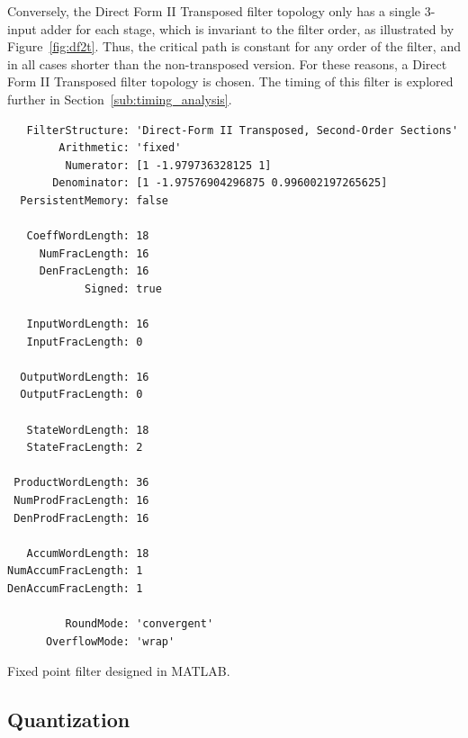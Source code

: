 \documentclass[]{article}
\begin{document}
Conversely, the Direct Form II Transposed filter topology only has a single 3-input adder for each stage, which is invariant to the filter order, as illustrated by Figure~\ref{fig:df2t}.
Thus, the critical path is constant for any order of the filter, and in all cases shorter than the non-transposed version. For these reasons, a Direct Form II Transposed filter topology is chosen. The timing of this filter is explored further in Section~\ref{sub:timing_analysis}.


\begin{table}[tbp]
	\begin{center}
		\begin{lstlisting}
   FilterStructure: 'Direct-Form II Transposed, Second-Order Sections'
        Arithmetic: 'fixed'
         Numerator: [1 -1.979736328125 1]                  
       Denominator: [1 -1.97576904296875 0.996002197265625]
  PersistentMemory: false

   CoeffWordLength: 18                
     NumFracLength: 16                
     DenFracLength: 16
            Signed: true              
                                      
   InputWordLength: 16                
   InputFracLength: 0                 
                                      
  OutputWordLength: 16
  OutputFracLength: 0                 
                                      
   StateWordLength: 18
   StateFracLength: 2                 
                                      
 ProductWordLength: 36                
 NumProdFracLength: 16                
 DenProdFracLength: 16                
                                      
   AccumWordLength: 18                
NumAccumFracLength: 1                 
DenAccumFracLength: 1                 

         RoundMode: 'convergent'      
      OverflowMode: 'wrap'  
		\end{lstlisting}
	\end{center}
	\caption{Fixed point filter designed in MATLAB.}
	\label{tab:Hdsdsos}
\end{table}

\subsection{Quantization} %
\label{sub:quantization}
\end{document}

